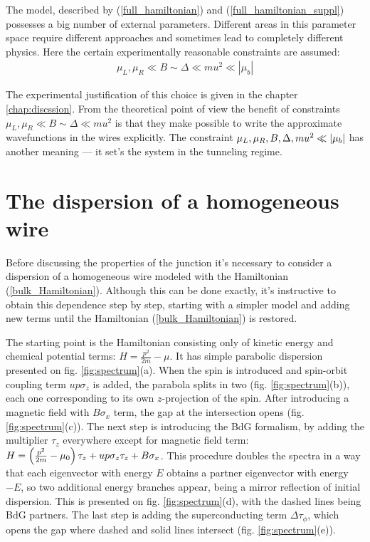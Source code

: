  The model, described by (\ref{full_hamiltonian}) and (\ref{full_hamiltonian_suppl}) possesses a big number of external parameters. Different areas in this parameter space require different approaches and sometimes lead to completely different physics. Here the certain experimentally reasonable constraints are assumed:
  \begin{gather}
 \label{constraints}
 	\mu_L,\mu_R \ll B \sim \Delta \ll mu^2\ll \left|\mu_b\right|
 \end{gather} 

  The experimental justification of this choice is given in the chapter \ref{chap:discssion}. From the theoretical point of view the benefit of constraints $ \mu_L,\mu_R \ll B \sim \Delta \ll mu^2 $ is that they make possible to write the approximate wavefunctions in the wires explicitly. The constraint $ \mu_L,\mu_R, B, \Delta, mu^2\ll \left|\mu_b\right|$ has another meaning --- it set's the system in the tunneling regime.
  


\section{The dispersion of a homogeneous wire}

Before discussing the properties of the junction it's necessary to consider a dispersion of a homogeneous wire modeled with the Hamiltonian (\ref{bulk_Hamiltonian}). Although this can be done exactly, it's instructive to obtain this dependence step by step, starting with a simpler model and adding new terms until the Hamiltonian (\ref{bulk_Hamiltonian}) is restored.

The starting point is the Hamiltonian consisting only of kinetic energy and chemical potential terms: $ H =\frac{ p^2}{2m} - \mu$. It has simple parabolic dispersion presented on fig. \ref{fig:spectrum}(a). When the spin is introduced and spin-orbit coupling term $ up\sigma_z $ is added, the parabola splits in two (fig. \ref{fig:spectrum}(b)), each one corresponding to its own $ z $-projection of the spin. After introducing a magnetic field with $ B\sigma_x $ term, the gap at the intersection opens (fig. \ref{fig:spectrum}(c)). The next step is introducing the BdG formalism, by adding the multiplier $ \tau_z $ everywhere except for magnetic field term:  $ 	H = \left(\frac{p^2}{2m} 	-\mu_0 \right)\tau_z +u p \sigma_z \tau_z + B\sigma_x	 $. This procedure doubles the spectra in a way that each eigenvector with energy $ E $ obtains a partner eigenvector with energy $ -E $, so two additional  energy branches appear, being a mirror reflection of  initial dispersion. This is presented on fig. \ref{fig:spectrum}(d), with the dashed lines being BdG partners. The last step is adding the superconducting term $ \Delta\tau_\phi $, which opens the gap where dashed and	 solid lines intersect (fig. \ref{fig:spectrum}(e)).

